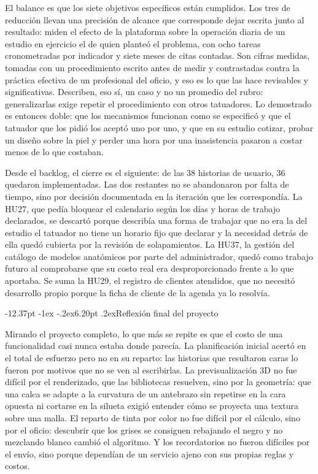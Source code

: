 \documentclass[12pt,letterpaper,oneside]{report}
\makeatletter
\renewcommand\section{\@startsection{section}{1}{\z@}%
  {-12.37pt \@plus -1ex \@minus -.2ex}{6.20pt \@plus.2ex}{\normalfont\large\bfseries}}
\makeatother
\begin{document}
El balance es que los siete objetivos específicos están cumplidos. Los tres de reducción llevan una precisión de alcance que corresponde dejar escrita junto al resultado: miden el efecto de la plataforma sobre la operación diaria de un estudio en ejercicio el de quien planteó el problema, con ocho tareas cronometradas por indicador y siete meses de citas contadas. Son cifras medidas, tomadas con un procedimiento escrito antes de medir y contrastadas contra la práctica efectiva de un profesional del oficio, y eso es lo que las hace revisables y significativas. Describen, eso sí, un caso y no un promedio del rubro: generalizarlas exige repetir el procedimiento con otros tatuadores. Lo demostrado es entonces doble: que los mecanismos funcionan como se especificó y que el tatuador que los pidió los aceptó uno por uno, y que en su estudio cotizar, probar un diseño sobre la piel y perder una hora por una inasistencia pasaron a costar menos de lo que costaban.

Desde el backlog, el cierre es el siguiente: de las 38 historias de usuario, 36 quedaron implementadas. Las dos restantes no se abandonaron por falta de tiempo, sino por decisión documentada en la iteración que les correspondía. La HU27, que pedía bloquear el calendario según los días y horas de trabajo declarados, se descartó porque describía una forma de trabajar que no era la del estudio el tatuador no tiene un horario fijo que declarar y la necesidad detrás de ella quedó cubierta por la revisión de solapamientos. La HU37, la gestión del catálogo de modelos anatómicos por parte del administrador, quedó como trabajo futuro al comprobarse que su costo real era desproporcionado frente a lo que aportaba. Se suma la HU29, el registro de clientes atendidos, que no necesitó desarrollo propio porque la ficha de cliente de la agenda ya lo resolvía.

\section{Reflexión final del proyecto}

Mirando el proyecto completo, lo que más se repite es que el costo de una funcionalidad casi nunca estaba donde parecía. La planificación inicial acertó en el total de esfuerzo pero no en su reparto: las historias que resultaron caras lo fueron por motivos que no se ven al escribirlas. La previsualización 3D no fue difícil por el renderizado, que las bibliotecas resuelven, sino por la geometría: que una calca se adapte a la curvatura de un antebrazo sin repetirse en la cara opuesta ni cortarse en la silueta exigió entender cómo se proyecta una textura sobre una malla. El reparto de tinta por color no fue difícil por el cálculo, sino por el oficio: descubrir que los grises se consiguen rebajando el negro y no mezclando blanco cambió el algoritmo. Y los recordatorios no fueron difíciles por el envío, sino porque dependían de un servicio ajeno con sus propias reglas y costos.
\end{document}
